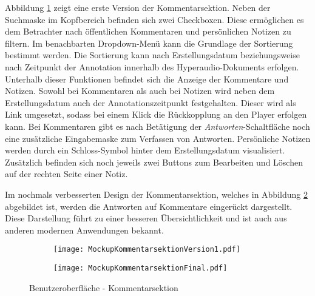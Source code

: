 Abbildung \ref{fig:MockupKommentarsektionVersion1} zeigt eine erste Version der Kommentarsektion. Neben der Suchmaske im Kopfbereich befinden sich zwei Checkboxen. Diese ermöglichen es dem Betrachter nach öffentlichen Kommentaren und persönlichen Notizen zu filtern. Im benachbarten Dropdown-Menü kann die Grundlage der Sortierung bestimmt werden. Die Sortierung kann nach Erstellungsdatum beziehungsweise nach Zeitpunkt der Annotation innerhalb des Hyperaudio-Dokuments erfolgen. Unterhalb dieser Funktionen befindet sich die Anzeige der Kommentare und Notizen. Sowohl bei Kommentaren als auch bei Notizen wird neben dem Erstellungsdatum auch der Annotationszeitpunkt festgehalten. Dieser wird als Link umgesetzt, sodass bei einem Klick die Rückkopplung an den Player erfolgen kann. Bei Kommentaren gibt es nach Betätigung der \textit{Antworten}-Schaltfläche noch eine zusätzliche Eingabemaske zum Verfassen von Antworten. Persönliche Notizen werden durch ein Schloss-Symbol hinter dem Erstellungsdatum visualisiert. Zusätzlich befinden sich noch jeweils zwei Buttons zum Bearbeiten und Löschen auf der rechten Seite einer Notiz.


Im nochmals verbesserten Design der Kommentarsektion, welches in Abbildung \ref{fig:MockupKommentarsektionFinal} abgebildet ist, werden die Antworten auf Kommentare eingerückt dargestellt. Diese Darstellung führt zu einer besseren Übersichtlichkeit und ist auch aus anderen modernen Anwendungen bekannt.

\begin{figure}[h!]
\begin{subfigure}[c]{\textwidth}
\texttt{[image: MockupKommentarsektionVersion1.pdf]}
\label{fig:MockupKommentarsektionVersion1}
\end{subfigure}
\par\bigskip
\begin{subfigure}[c]{\textwidth}
\texttt{[image: MockupKommentarsektionFinal.pdf]}
\label{fig:MockupKommentarsektionFinal}
\end{subfigure}
\caption{Benutzeroberfläche - Kommentarsektion}
\label{fig:MockupKommentarsektion}
\end{figure}

